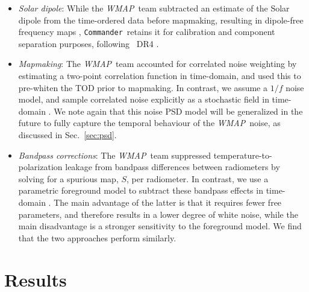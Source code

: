 \documentclass[twocolumn]{aa}
\def\WMAP{\emph{WMAP}}
\def\commander{\texttt{Commander}}
\begin{document}
\begin{itemize}
  treated as separate terms, there is a correlation between gain,
  baseline, and $1/f$ noise, as discussed in \citet{hinshaw2003a}. To
  address this, the \WMAP{} team applied a whitening filter using an
  estimate of the $1/f$ noise spectrum, and iteratively solved for the
  baseline. In contrast, we fit a linear baseline per weeklong scan in 
  the \commander\ pipeline, and residual baseline fluctuations are absorbed
  by the $\boldsymbol n^\mathrm{corr}$ sampling \citep{bp06}.
\item \emph{Solar dipole}: While the \WMAP\ team subtracted an estimate of the
  Solar dipole from the time-ordered data before mapmaking, resulting
  in dipole-free frequency maps \citep{hinshaw2003a}, \commander\ retains it
  for calibration and component separation purposes, following
  \Planck\ DR4 \citep{npipe,bp07,bp13}.
\item \emph{Mapmaking}: The \WMAP\ team accounted for correlated noise weighting
  by estimating a two-point correlation function in time-domain, and
  used this to pre-whiten the TOD prior to mapmaking. In contrast,
  we assume a $1/f$ noise model, and sample correlated noise
  explicitly as a stochastic field in time-domain \citep{bp06}. We
  note again that this noise PSD model will be generalized in the
  future to fully capture the temporal behaviour of the \WMAP\ noise,
  as discussed in Sec.~\ref{sec:psd}.
\item \emph{Bandpass corrections}: The \WMAP\ team suppressed
  temperature-to-polarization leakage from bandpass differences
  between radiometers by solving for a spurious map, $S$, per
  radiometer. In contrast, we use a parametric
  foreground model to subtract these bandpass effects in time-domain
  \citep{bp09}. The main advantage of the latter is that it requires fewer free
  parameters, and therefore results in a lower degree of white noise, while the
  main disadvantage is a stronger sensitivity to the foreground
  model. We find that the two approaches perform similarly. 
\end{itemize}







\section{Results}
\label{sec:Results}
\end{document}
